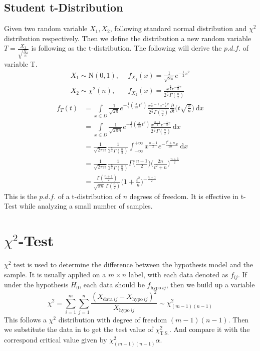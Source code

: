 \documentclass[16pt]{article}
\begin{document}
\subsection{Student t-Distribution}
Given two random variable $X_1, X_2$, following standard normal distribution and $\chi^2$ distribution respectively. Then we define the distribution a new random variable $T = \frac{X_1}{\sqrt{\frac{X_2}{n}}}$ is following as the t-distribution. The following will derive the $p.d.f.$ of variable T.
\begin{equation}
\begin{aligned}
    X_1 \sim \text{N}(0,1),&~~f_{X_1}(x) = \frac{1}{\sqrt{2\pi}}e^{-\frac{1}{2}x^2}\\
    X_2 \sim \chi^2(n),&~~f_{X_2}(x) = \frac{x^{\frac{n}{2}}e^{-\frac{1}{2}x}}{2^{\frac{n}{2}}\Gamma(\frac{n}{2})}
\end{aligned}
\end{equation}
\begin{equation}
\begin{aligned}
    f_{T}(t) &= \int \limits_{x\in D} \frac{1}{\sqrt{2\pi}}e^{-\frac{1}{2}(\frac{x}{2n}t^2)} \frac{x^{\frac{n}{2}-1}e^{-\frac{1}{2}x}}{2^{\frac{n}{2}}\Gamma(\frac{n}{2})} \frac{\partial}{\partial t} \bigg(t\sqrt{\frac{x}{n}}\bigg)~\text{d}x \\
    &= \int \limits_{x\in D} \frac{1}{\sqrt{2\pi n}}e^{-\frac{1}{2}(\frac{x}{2n}t^2)} \frac{x^{\frac{n-1}{2}}e^{-\frac{1}{2}x}}{2^{\frac{n}{2}}\Gamma(\frac{n}{2})} ~\text{d}x \\
    &= \frac{1}{\sqrt{2 \pi n}} \frac{1}{2^{\frac{n}{2}}\Gamma(\frac{n}{2})} \int^{+\infty}_{-\infty} x^{\frac{n-1}{2}}e^{-\frac{t^2+n}{2n} x} ~\text{d} x \\
    &= \frac{1}{\sqrt{2 \pi n}} \frac{1}{2^{\frac{n}{2}}\Gamma(\frac{n}{2})} \Gamma\bigg(\frac{n+1}{2}\bigg)\bigg(\frac{2n}{t^2+n} \bigg)^{\frac{n+1}{2}}  \\
    &= \boxed{\frac{\Gamma(\frac{n+1}{2})}{\sqrt{\pi n } ~\Gamma(\frac{n}{2})} \bigg(1+\frac{t^2}{n}\bigg)^{-\frac{n+1}{2}}}
\end{aligned}
\end{equation}
This is the $p.d.f.$ of a t-distribution of $n$ degrees of freedom. It is effective in t-Test while analyzing a small number of samples.
\section{$\chi^2$-Test}
$\chi^2$ test is used to determine the difference between the hypothesis model and the sample. It is usually applied on a $m \times n$ label, with each data denoted as $f_{ij}$. If under the hypothesis $H_0$, each data should be $f_{\text{hypo}~ij}$, then we build up a variable
\begin{equation}
    \chi^2 = \sum_{i=1}^{m} \sum_{j=1}^{n} \frac{(X_{\text{data}~ij} - X_{\text{hypo}~ij})^2}{X_{\text{hypo}~ij}} \sim \chi^2_{(m-1)(n-1)}
\end{equation}
This follows a $\chi^2$ distribution with degree of freedom $(m-1)(n-1)$. Then we substitute the data in to get the test value of $\chi^2_{\text{T.S.}}$. And compare it with the correspond critical value given by $\chi^2_{(m-1)(n-1)} \alpha$.

\end{document}
